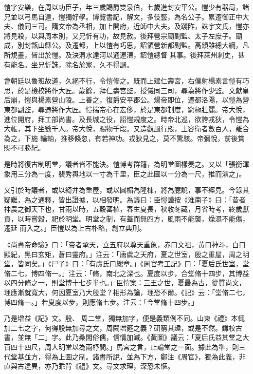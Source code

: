 \begin{pinyinscope}
 愷字安樂，在周以功臣子，年三歲賜爵雙泉伯，七歲進封安平公。愷少有器局，諸兄並以弓馬自達，愷獨好學。博覽書記，解文，多伎藝，為名公子。累遷御正中大夫、儀同三司。隋文帝為丞相，加上開府，近師中大夫。及踐阼，誅宇文氏，愷亦將見殺，以與周本別，又兄忻有功，故見赦。後拜營宗廟副監、太子左庶子。廟成，別封甑山縣公。及遷都，上以愷有巧思，詔領營新都副監。高熲雖總大綱，凡所規畫，皆出於愷。及決渭水達河以通運漕，詔愷總督
 其事。後拜萊州刺史，甚有能名。坐兄忻誅，除名於家，久不得調。



 會朝廷以魯班故道，久絕不行，令愷修之。既而上建仁壽宮，右僕射楊素言愷有巧思，於是檢校將作大匠。歲餘，拜仁壽宮監，授儀同三司，尋為將作少監。文獻皇后崩，愷與楊素營山陵。上善之，復爵安平郡公。煬帝即位，遷都洛陽，以愷為營東都副監，尋遷將作大匠。愷揣帝心在宏侈，於是東都制度，窮極壯麗。帝大悅，進位開府，拜工部尚書。及長城之役，詔愷規度之。時帝北巡，欲誇戎狄，令愷為大帳，其下坐數千人。帝大悅，賜物千段。又造觀風行殿，上容衛者數百人，離合為之，下施
 輪軸，推移倏忽，有若神功。戎狄見之，莫不驚駭。帝彌悅，前後賞賜不可勝紀。



 是時將復古制明堂，議者皆不能決。愷博考群籍，為明堂圖樣奏之。又以「張衡渾象用三分為一度，裴秀輿地以一寸為千里，臣之此圖以一分為一尺，推而演之」。



 又引於時議者，或以綺井為重屋，或以圓楣為隆棟，將為臆說，事不經見。今錄其疑難，為之通釋，皆出證據，以相發明。為議曰：臣愷謹按《淮南子》曰：「昔者神農之御天下也，甘雨以時，五穀蕃植，春生夏長，秋收冬藏，月省時考，終歲獻貢，以時嘗穀，祀於明堂。明堂之制，有蓋而無四方，風雨不能襲，燥濕不能傷，遷延
 而入之。」臣愷以為上古朴略，創立典刑。



 《尚書帝命驗》曰：「帝者承天，立五府以尊天重象，赤曰文祖，黃曰神斗，白曰顯紀，黑曰玄矩，蒼曰靈府。」注云：「唐虞之天府，夏之世室，殷之重屋，周之明堂，皆同矣。」《尸子》曰：「有虞氏曰總章。」《周官考工記》曰：「夏后氏世室，堂脩二七，博四脩一。」注云：「脩，南北之深也。夏度以步，合堂脩十四步，其博益以四分脩之一，則堂博十七步半也。」臣愷案：三王之世，夏最為古，從質尚文，理應漸就寬大，何因夏室乃大殷堂？相形為論，理恐不爾。《記》云：「堂脩二七，博四脩一。」若夏度以步，則應脩七步。注云：「今堂脩十四步。」



 乃是增益《記》文。殷、
 周二堂，獨無加字，便是義類例不同。山東《禮》本輒加二七之字，何得殷無加尋之文，周闕增筵之義？研窮其趣，或是不然。讎校古書，並無「二」字。此乃桑間俗儒，信情加減。《黃圖》議云：「夏后氏益其堂之大百四十四尺，周人明堂以為兩杼間。」馬宮之言，止論堂之一面。據此為準，則三代堂基並方，得為上圖之制。諸書所說，並為下方，鄭注《周官》，獨為此義，非直與古違異，亦乃乖背《禮》文。尋文求理，深恐未愜。




\end{pinyinscope}
